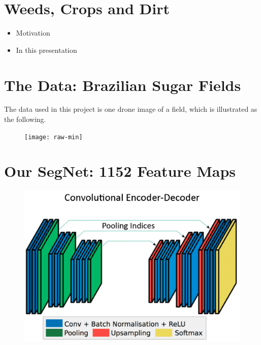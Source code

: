 \documentclass[
]{dtuposter}
\begin{document}
%
%
\begin{dtuposterhead} %
\end{dtuposterhead}
%
%
\begin{dtupostercontent}
\section{Weeds, Crops and Dirt}

\begin{itemize}
	\item Motivation
	
	\item In this presentation
\end{itemize}
 
\section{The Data: Brazilian Sugar Fields}
The data used in this project is one drone image of a field, which is illustrated as the following.
\begin{figure}
\centering
\texttt{[image: raw-min]}
\end{figure}


\section{Our SegNet: 1152 Feature Maps}


\begin{figure}
	\centering
	\includegraphics[width=0.8\linewidth]{Structure}
	\caption{}
	\label{fig:Structure}
\end{figure}
 

\end{dtupostercontent}
\end{document}
